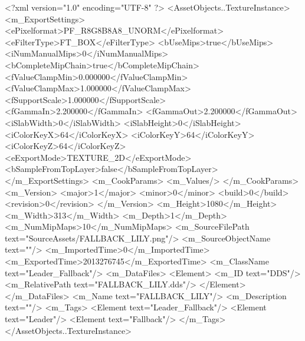 <?xml version="1.0" encoding="UTF-8" ?>
<AssetObjects..TextureInstance>
	<m_ExportSettings>
		<ePixelformat>PF_R8G8B8A8_UNORM</ePixelformat>
		<eFilterType>FT_BOX</eFilterType>
		<bUseMips>true</bUseMips>
		<iNumManualMips>0</iNumManualMips>
		<bCompleteMipChain>true</bCompleteMipChain>
		<fValueClampMin>0.000000</fValueClampMin>
		<fValueClampMax>1.000000</fValueClampMax>
		<fSupportScale>1.000000</fSupportScale>
		<fGammaIn>2.200000</fGammaIn>
		<fGammaOut>2.200000</fGammaOut>
		<iSlabWidth>0</iSlabWidth>
		<iSlabHeight>0</iSlabHeight>
		<iColorKeyX>64</iColorKeyX>
		<iColorKeyY>64</iColorKeyY>
		<iColorKeyZ>64</iColorKeyZ>
		<eExportMode>TEXTURE_2D</eExportMode>
		<bSampleFromTopLayer>false</bSampleFromTopLayer>
	</m_ExportSettings>
	<m_CookParams>
		<m_Values/>
	</m_CookParams>
	<m_Version>
		<major>1</major>
		<minor>0</minor>
		<build>0</build>
		<revision>0</revision>
	</m_Version>
	<m_Height>1080</m_Height>
	<m_Width>313</m_Width>
	<m_Depth>1</m_Depth>
	<m_NumMipMaps>10</m_NumMipMaps>
	<m_SourceFilePath text="SourceAssets/FALLBACK_LILY.png"/>
	<m_SourceObjectName text=""/>
	<m_ImportedTime>0</m_ImportedTime>
	<m_ExportedTime>2013276745</m_ExportedTime>
	<m_ClassName text="Leader_Fallback"/>
	<m_DataFiles>
		<Element>
			<m_ID text="DDS"/>
			<m_RelativePath text="FALLBACK_LILY.dds"/>
		</Element>
	</m_DataFiles>
	<m_Name text="FALLBACK_LILY"/>
	<m_Description text=""/>
	<m_Tags>
		<Element text="Leader_Fallback"/>
		<Element text="Leader"/>
		<Element text="Fallback"/>
	</m_Tags>
</AssetObjects..TextureInstance>

